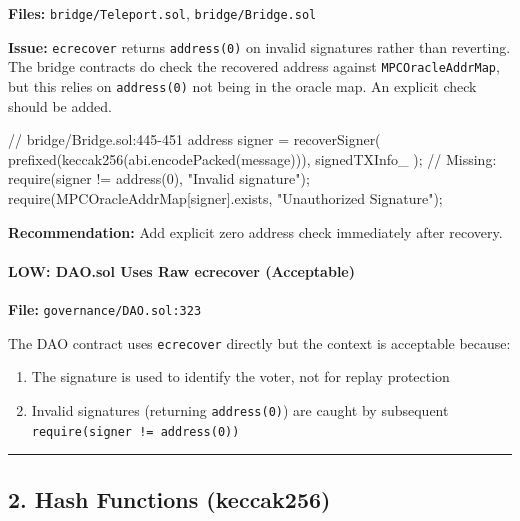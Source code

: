 \documentclass[
]{article}
\newenvironment{Shaded}{}{}
\newcommand{\NormalTok}[1]{#1}
\providecommand{\tightlist}{%
  \setlength{\itemsep}{0pt}\setlength{\parskip}{0pt}}
\begin{document}
\textbf{Files:} \texttt{bridge/Teleport.sol}, \texttt{bridge/Bridge.sol}

\textbf{Issue:} \texttt{ecrecover} returns \texttt{address(0)} on
invalid signatures rather than reverting. The bridge contracts do check
the recovered address against \texttt{MPCOracleAddrMap}, but this relies
on \texttt{address(0)} not being in the oracle map. An explicit check
should be added.

\begin{Shaded}
\begin{Highlighting}[]
\NormalTok{// bridge/Bridge.sol:445{-}451}
\NormalTok{address signer = recoverSigner(}
\NormalTok{    prefixed(keccak256(abi.encodePacked(message))),}
\NormalTok{    signedTXInfo\_}
\NormalTok{);}
\NormalTok{// Missing: require(signer != address(0), "Invalid signature");}
\NormalTok{require(MPCOracleAddrMap[signer].exists, "Unauthorized Signature");}
\end{Highlighting}
\end{Shaded}

\textbf{Recommendation:} Add explicit zero address check immediately
after recovery.

\paragraph{LOW: DAO.sol Uses Raw ecrecover
(Acceptable)}\label{low-daosol-uses-raw-ecrecover-acceptable}

\textbf{File:} \texttt{governance/DAO.sol:323}

The DAO contract uses \texttt{ecrecover} directly but the context is
acceptable because:

\begin{enumerate}
\def\labelenumi{\arabic{enumi}.}
\tightlist
\item
  The signature is used to identify the voter, not for replay protection
\item
  Invalid signatures (returning \texttt{address(0)}) are caught by
  subsequent \texttt{require(signer\ !=\ address(0))}
\end{enumerate}

\begin{center}\rule{0.5\linewidth}{0.5pt}\end{center}

\subsection{2. Hash Functions
(keccak256)}\label{2-hash-functions-keccak256}
\end{document}
